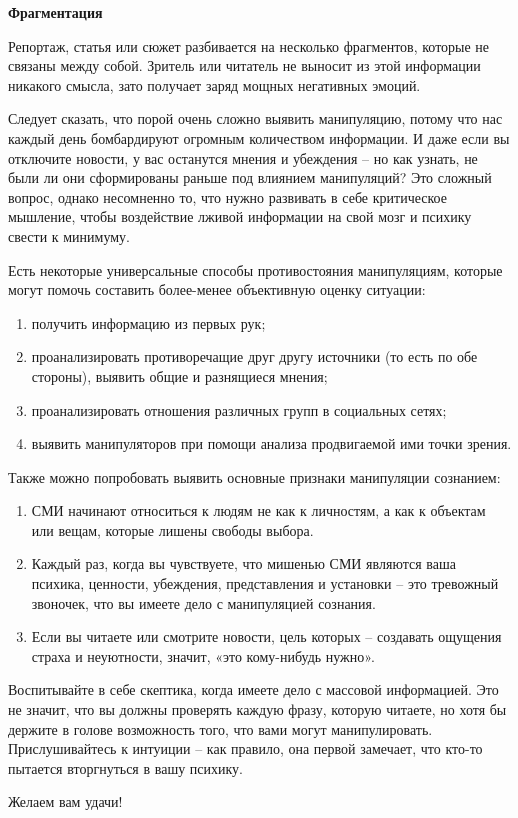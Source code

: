 \textbf{Фрагментация}

Репортаж, статья или сюжет разбивается на несколько фрагментов, которые не связаны между собой. Зритель или читатель не выносит из этой информации никакого смысла, зато получает заряд мощных негативных эмоций.

Следует сказать, что порой очень сложно выявить манипуляцию, потому что нас каждый день бомбардируют огромным количеством информации. И даже если вы отключите новости, у вас останутся мнения и убеждения – но как узнать, не были ли они сформированы раньше под влиянием манипуляций? Это сложный вопрос, однако несомненно то, что нужно развивать в себе критическое мышление, чтобы воздействие лживой информации на свой мозг и психику свести к минимуму.

Есть некоторые универсальные способы противостояния манипуляциям, которые могут помочь составить более-менее объективную оценку ситуации:
\begin{enumerate}
    \item получить информацию из первых рук;
    \item проанализировать противоречащие друг другу источники (то есть по обе стороны), выявить общие и разнящиеся мнения;
    \item проанализировать отношения различных групп в социальных сетях;
    \item выявить манипуляторов при помощи анализа продвигаемой ими точки зрения.
\end{enumerate}

Также можно попробовать выявить основные признаки манипуляции сознанием:
\begin{enumerate}
    \item СМИ начинают относиться к людям не как к личностям, а как к объектам или вещам, которые лишены свободы выбора.
    \item Каждый раз, когда вы чувствуете, что мишенью СМИ являются ваша психика, ценности, убеждения, представления и установки – это тревожный звоночек, что вы имеете дело с манипуляцией сознания.
    \item Если вы читаете или смотрите новости, цель которых – создавать ощущения страха и неуютности, значит, «это кому-нибудь нужно».
\end{enumerate}

Воспитывайте в себе скептика, когда имеете дело с массовой информацией. Это не значит, что вы должны проверять каждую фразу, которую читаете, но хотя бы держите в голове возможность того, что вами могут манипулировать. Прислушивайтесь к интуиции – как правило, она первой замечает, что кто-то пытается вторгнуться в вашу психику.

Желаем вам удачи!